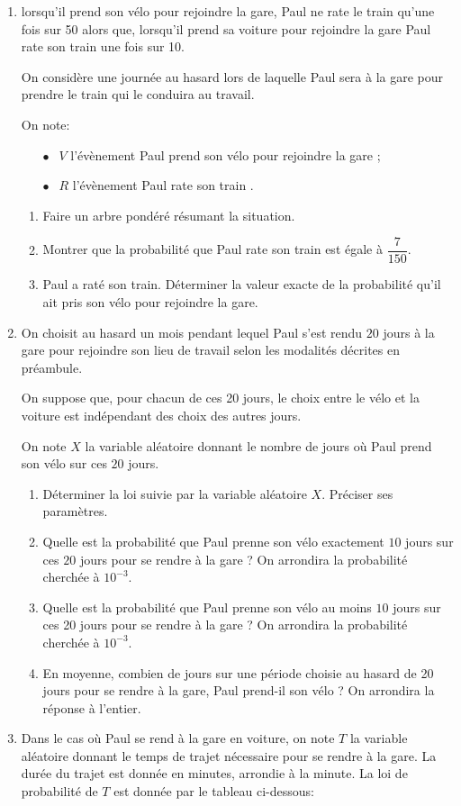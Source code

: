 \documentclass[10pt]{article}
\begin{document}
\begin{enumerate}
\item lorsqu'il prend son vélo pour rejoindre la gare, Paul ne rate le train qu'une fois sur 50 alors que, lorsqu'il prend sa voiture pour rejoindre la gare Paul rate son train une fois sur 10.

On considère une journée au hasard lors de laquelle Paul sera à la gare pour prendre le train qui le conduira au travail.

On note:

\setlength\parindent{8mm}
\begin{itemize}
\item[$\bullet~~$] $V$ l'évènement \og Paul prend son vélo pour rejoindre la gare \fg{} ; 
\item[$\bullet~~$] $R$ l'évènement \og Paul rate son train \fg.
\end{itemize}
\setlength\parindent{0mm}

	\begin{enumerate}
		\item Faire un arbre pondéré résumant la situation.
		\item Montrer que la probabilité que Paul rate son train est égale à $\dfrac{7}{150}$.
		\item Paul a raté son train. Déterminer la valeur exacte de la probabilité qu'il ait pris son vélo pour rejoindre la gare.
	\end{enumerate}
\item On choisit au hasard un mois pendant lequel Paul s'est rendu $20$ jours à la gare pour rejoindre son lieu de travail selon les modalités décrites en préambule. 

On suppose que, pour chacun de ces 20 jours, le choix entre le vélo et
la voiture est indépendant des choix des autres jours.

On note $X$ la variable aléatoire donnant le nombre de jours où Paul prend son vélo sur ces $20$ jours.
	\begin{enumerate}
		\item Déterminer la loi suivie par la variable aléatoire $X$. Préciser ses paramètres.
		\item Quelle est la probabilité que Paul prenne son vélo exactement $10$ jours sur ces $20$ jours pour se rendre à la gare ? On arrondira la probabilité cherchée à $10^{-3}$.
		\item Quelle est la probabilité que Paul prenne son vélo au moins $10$ jours sur ces 20 jours pour se rendre à la gare ?
On arrondira la probabilité cherchée à $10^{-3}$.
		\item En moyenne, combien de jours sur une période choisie au hasard de 20 jours pour se rendre à la gare, Paul prend-il son vélo ? On arrondira la réponse à l'entier.
	\end{enumerate}
\item Dans le cas où Paul se rend à la gare en voiture, on note $T$ la variable aléatoire donnant le temps de trajet nécessaire pour se rendre à la gare. La durée du trajet est donnée en minutes, arrondie à la minute. La loi de probabilité de $T$ est donnée par le tableau ci-dessous:


\end{enumerate}
\end{document}
